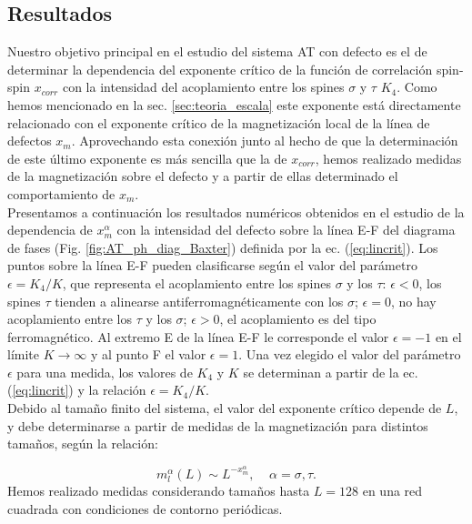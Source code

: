 \subsection{Resultados}
\label{sec:results_AT_line}

Nuestro objetivo principal en el estudio del sistema AT con defecto es el de determinar la dependencia
 del exponente crítico de la función de correlación spin-spin $x_{corr}$ con la intensidad del acoplamiento entre los spines
 $\sigma$ y $\tau$ $K_{4}$. Como hemos mencionado en la sec. \ref{sec:teoria_escala} este exponente está directamente relacionado
 con el exponente crítico de la magnetización local de la línea de defectos $x_{m}$. Aprovechando esta conexión junto al hecho de que
 la determinación de este último exponente es más sencilla que la de $x_{corr}$, hemos realizado medidas de la magnetización sobre el defecto
 y a partir de ellas determinado el comportamiento de $x_{m}$.\\

Presentamos a continuación los resultados numéricos obtenidos en el estudio de la dependencia de
 $x_{m}^{\alpha}$ con la intensidad del defecto sobre la l\'inea E-F del diagrama de fases (Fig. \ref{fig:AT_ph_diag_Baxter}) definida por la ec. (\ref{eq:lincrit}).
Los puntos sobre la l\'inea E-F pueden clasificarse seg\'un el valor del par\'ametro $\epsilon=K_{4}/K$, que representa el acoplamiento
 entre los spines $\sigma$ y los $\tau$:
$\epsilon<0$, los spines $\tau$ tienden a alinearse antiferromagnéticamente con los $\sigma$; $\epsilon=0$, no hay acoplamiento
 entre los $\tau$ y los $\sigma$; $\epsilon>0$, el acoplamiento es del tipo ferromagnético.
Al extremo E de la l\'inea E-F le corresponde el valor $\epsilon = -1$ en el l\'imite $K\rightarrow \infty$ y al punto F el valor $\epsilon = 1$.
 Una vez elegido el valor del par\'ametro $\epsilon$
 para una medida, los valores de $K_{4}$ y $K$ se determinan a  partir de la ec. (\ref{eq:lincrit}) y la relaci\'on $\epsilon=K_{4}/K$.\\

Debido al tamaño finito del sistema, el valor del exponente cr\'itico depende de $L$, y debe determinarse a partir de medidas de la magnetización para distintos tamaños,
 seg\'un la relación:

\begin{equation}
	\label{eq:magvsL}
	m_{l}^{\alpha}(L)\sim L^{-x_{m}^{\alpha}}, \; \; \; \; \alpha=\sigma , \tau .
\end{equation}
Hemos realizado medidas considerando tamaños hasta $L=128$ en una red cuadrada con condiciones de contorno periódicas.\\

